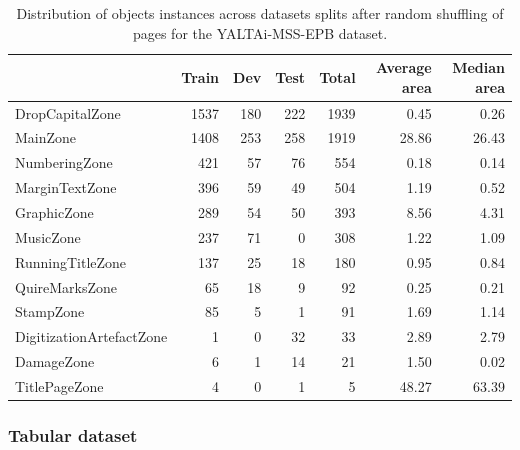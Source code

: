 \documentclass{jdmdh}
\begin{document}
\begin{table}[ht]
    \centering
    \begin{tabular}{l|rrr|r|rr}
    \hline
                              &   Train &   Dev &   Test &   Total &   Average area &   Median area \\
    \hline
     DropCapitalZone          &    1537 &   180 &    222 &    1939 &           0.45 &          0.26 \\
     MainZone                 &    1408 &   253 &    258 &    1919 &          28.86 &         26.43 \\
     NumberingZone            &     421 &    57 &     76 &     554 &           0.18 &          0.14 \\
     MarginTextZone           &     396 &    59 &     49 &     504 &           1.19 &          0.52 \\
     GraphicZone              &     289 &    54 &     50 &     393 &           8.56 &          4.31 \\
     MusicZone                &     237 &    71 &      0 &     308 &           1.22 &          1.09 \\
     RunningTitleZone         &     137 &    25 &     18 &     180 &           0.95 &          0.84 \\
     QuireMarksZone           &      65 &    18 &      9 &      92 &           0.25 &          0.21 \\
     StampZone                &      85 &     5 &      1 &      91 &           1.69 &          1.14 \\
     DigitizationArtefactZone &       1 &     0 &     32 &      33 &           2.89 &          2.79 \\
     DamageZone               &       6 &     1 &     14 &      21 &           1.50 &          0.02 \\
     TitlePageZone            &       4 &     0 &      1 &       5 &          48.27 &         63.39 \\
    \hline
    \end{tabular}
    \caption{Distribution of objects instances across datasets splits after random shuffling of pages for the YALTAi-MSS-EPB dataset.}
    \label{tab:comp:segmonto}
\end{table}

\subsubsection{Tabular dataset}
\label{subsubsection:tabulardataset}
\end{document}
